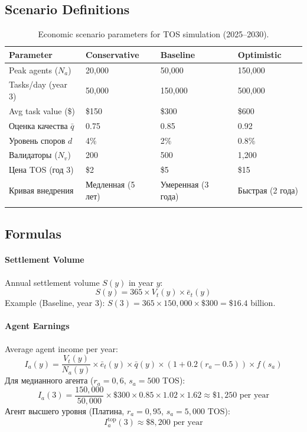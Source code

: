 \documentclass[11pt]{article}
\begin{document}
\subsection{Scenario Definitions}
\begin{longtable}{@{}p{}p{}p{}p{}@{}}
\toprule
\textbf{Parameter} & \textbf{Conservative} & \textbf{Baseline} & \textbf{Optimistic} \\\midrule
Peak agents ($N_a$) & 20,000 & 50,000 & 150,000 \\
Tasks/day (year 3) & 50,000 & 150,000 & 500,000 \\
Avg task value (\$) & \$150 & \$300 & \$600 \\
Оценка качества $\bar{q}$ & 0.75 & 0.85 & 0.92 \\
Уровень споров $d$ & 4\% & 2\% & 0.8\% \\
Валидаторы ($N_v$) & 200 & 500 & 1,200 \\
Цена TOS (год 3) & \$2 & \$5 & \$15 \\
Кривая внедрения & Медленная (5 лет) & Умеренная (3 года) & Быстрая (2 года) \\\bottomrule
\caption{Economic scenario parameters for TOS simulation (2025--2030).}
\label{tab:econ-scenarios}
\end{longtable}

\subsection{Formulas}
\paragraph{Settlement Volume} Annual settlement volume $S(y)$ in year $y$:
\begin{equation}
S(y) = 365 \times V_t(y) \times \bar{e}_t(y)
\end{equation}
Example (Baseline, year 3): $S(3) = 365 \times 150{,}000 \times \$300 = \$16.4$ billion.

\paragraph{Agent Earnings} Average agent income per year:
\begin{equation}
I_a(y) = \frac{V_t(y)}{N_a(y)} \times \bar{e}_t(y) \times \bar{q}(y) \times (1 + 0.2(r_a - 0.5)) \times f(s_a)
\end{equation}
Для медианного агента ($r_a = 0,6$, $s_a = 500$ TOS):
\begin{equation}
I_a(3) = \frac{150{,}000}{50{,}000} \times \$300 \times 0.85 \times 1.02 \times 1.62 \approx \$1{,}250 \text{ per year}
\end{equation}
Агент высшего уровня (Платина, $r_a = 0,95$, $s_a = 5{,}000$ TOS):
\begin{equation}
I_a^{\text{top}}(3) \approx \$8{,}200 \text{ per year}
\end{equation}
\end{document}
